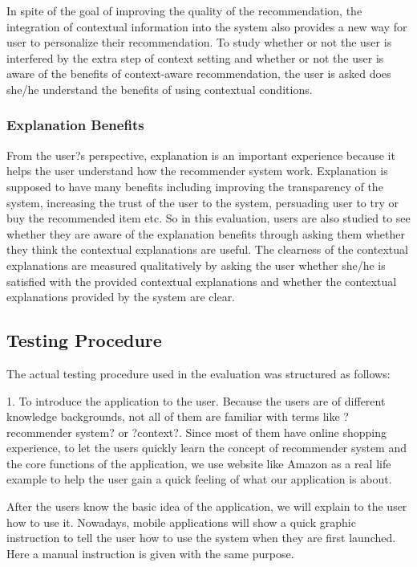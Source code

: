In spite of the goal of improving the quality of the recommendation, the integration of contextual information into the system also provides a new way for user to personalize their recommendation. To study whether or not the user is interfered by the extra step of context setting and whether or not the user is aware of the benefits of context-aware recommendation, the user is asked does she/he understand the benefits of using contextual conditions.

\subsubsection{Explanation Benefits} \label{sec:ts_tf_eb}

From the user?s perspective, explanation is an important experience because it helps the user understand how the recommender system work. Explanation is supposed to have many benefits including improving the transparency of the system, increasing the trust of the user to the system, persuading user to try or buy the recommended item etc. So in this evaluation, users are also studied to see whether they are aware of the explanation benefits through asking them whether they think the contextual explanations are useful. The clearness of the contextual explanations are measured qualitatively by asking the user whether she/he is satisfied with the provided contextual explanations and whether the contextual explanations provided by the system are clear.

\subsection{Testing Procedure} \label{sec:ts_tp}

The actual testing procedure used in the evaluation was structured as follows:

1. To introduce the application to the user.
Because the users are of different knowledge backgrounds, not all of them are familiar with terms like ?recommender system? or ?context?. Since most of them have online shopping experience, to let the users quickly learn the concept of recommender system and the core functions of the application, we use website like Amazon as a real life example to help the user gain a quick feeling of what our application is about.

After the users know the basic idea of the application, we will explain to the user how to use it. Nowadays, mobile applications will show a quick graphic instruction to tell the user how to use the system when they are first launched. Here a manual instruction is given with the same purpose.

